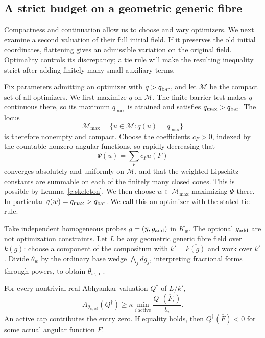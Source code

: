 \subsection{A strict budget on a geometric generic fibre}

Compactness and continuation allow us to choose and vary optimizers.
We next examine a second valuation of their full initial field. If it
preserves the old initial coordinates, flattening gives an admissible
variation on the original field. Optimality controls its discrepancy;
a tie rule will make the resulting inequality strict after adding
finitely many small auxiliary terms.

Fix parameters admitting an optimizer with \(q>q_{\rm bar}\),
and let \(\mathcal M\) be the compact set of all optimizers.
We first maximize \(q\) on \(\mathcal M\).  The finite barrier
test makes \(q\) continuous there, so its maximum \(q_{\max}\)
is attained and satisfies \(q_{\max}>q_{\rm bar}\).  The locus
\[
             \mathcal M_{\max}=\{u\in\mathcal M:q(u)=q_{\max}\}
\]
is therefore nonempty and compact.
Choose the coefficients \(c_F>0\), indexed by the countable nonzero
angular functions, so rapidly decreasing that
\[
                          \Psi(u)=\sum_F c_Fu(F)
\]
converges absolutely and uniformly on \(\mathcal M\), and that
the weighted Lipschitz constants are summable on each of the
finitely many closed cones.  This is possible by
Lemma~\ref{c:skeleton}.
We then choose \(w\in\mathcal M_{\max}\) maximizing \(\Psi\)
there.  In particular \(q(w)=q_{\max}>q_{\rm bar}\).  We call
this an optimizer with the stated tie rule.

Take independent homogeneous probes
\(g=(\overline y,g_{\rm add})\) in \(K_w\).  The optional
\(g_{\rm add}\) are not optimization constraints.  Let \(L\)
be any geometric generic fibre field over \(k(g)\): choose a
component of the compositum with
\(k'=\overline{k(g)}\) and work over \(k'\).  Divide \(\theta_w\)
by the ordinary base wedge \(\bigwedge_j dg_j\), interpreting
fractional forms through powers, to obtain
\(\theta_{w,\mathrm{rel}}\).

\begin{proposition}
\label{c:relative-budget}
For every nontrivial real Abhyankar valuation \(Q^\dagger\) of
\(L/k'\),
\begin{equation}\label{eq:E4}
 A_{\theta_{w,\mathrm{rel}}}(Q^\dagger)
       \ge \kappa\min_{i\ \mathrm{active}}
                       \frac{Q^\dagger(\overline F_i)}{b_i}.
\end{equation}
An active cap contributes the entry zero.  If equality holds,
then \(Q^\dagger(\overline F)<0\) for some actual angular
function \(F\).
\end{proposition}

